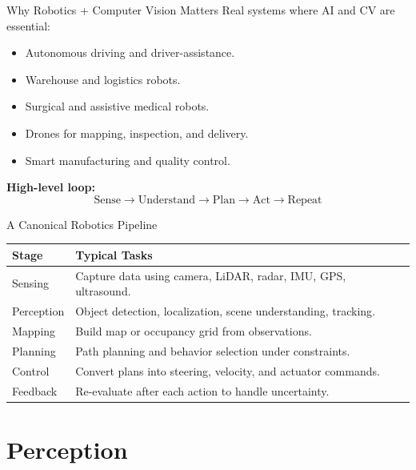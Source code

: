 \documentclass[10pt]{beamer}
\begin{document}
\begin{frame}{Why Robotics + Computer Vision Matters}
    Real systems where AI and CV are essential:
    \begin{itemize}
        \item Autonomous driving and driver-assistance.
        \item Warehouse and logistics robots.
        \item Surgical and assistive medical robots.
        \item Drones for mapping, inspection, and delivery.
        \item Smart manufacturing and quality control.
    \end{itemize}

    \vspace{0.2cm}
    \textbf{High-level loop:}
    \[
      \text{Sense} \rightarrow \text{Understand} \rightarrow \text{Plan} \rightarrow \text{Act} \rightarrow \text{Repeat}
    \]
\end{frame}

\begin{frame}{A Canonical Robotics Pipeline}
    \small
    \setlength{\tabcolsep}{8pt}
    \renewcommand{\arraystretch}{1.2}
    \begin{tabular}{>{\raggedright\arraybackslash}p{2.8cm} >{\raggedright\arraybackslash}p{7.2cm}}
        \toprule
        \textbf{Stage} & \textbf{Typical Tasks} \\
        \midrule
        Sensing & Capture data using camera, LiDAR, radar, IMU, GPS, ultrasound. \\
        Perception & Object detection, localization, scene understanding, tracking. \\
        Mapping & Build map or occupancy grid from observations. \\
        Planning & Path planning and behavior selection under constraints. \\
        Control & Convert plans into steering, velocity, and actuator commands. \\
        Feedback & Re-evaluate after each action to handle uncertainty. \\
        \bottomrule
    \end{tabular}
\end{frame}

\section{Perception}
\end{document}
